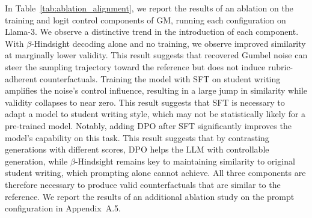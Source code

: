 \documentclass[letterpaper]{article} %
\begin{document}
In Table~\ref{tab:ablation_alignment}, we report the results of an ablation on the training and logit control components of GM, running each configuration on Llama-3. We observe a distinctive trend in the introduction of each component. With $\beta$-Hindsight decoding alone and no training, we observe improved similarity at marginally lower validity. This result suggests that recovered Gumbel noise can steer the sampling trajectory toward the reference but does not induce rubric-adherent counterfactuals. Training the model with SFT on student writing amplifies the noise's control influence, resulting in a large jump in similarity while validity collapses to near zero. This result suggests that SFT is necessary to adapt a model to student writing style, which may not be statistically likely for a pre-trained model. 
Notably, adding DPO after SFT significantly improves the model's capability on this task. This result suggests that by contrasting generations with different scores, DPO helps the LLM with controllable generation, while $\beta$-Hindsight remains key to maintaining similarity to original student writing, which prompting alone cannot achieve. All three components are therefore necessary to produce valid counterfactuals that are similar to the reference. We report the results of an additional ablation study on the prompt configuration in Appendix~A.5. 




\end{document}
